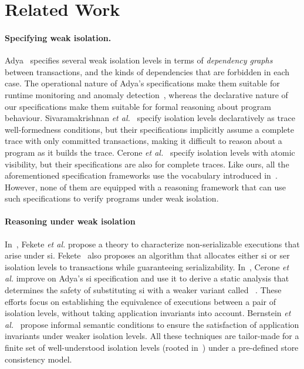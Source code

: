 \vspace*{-8pt}
\section{Related Work}
\label{sec:relatedwork}

\paragraph{Specifying weak isolation.}
Adya~\cite{adyaphd} specifies several weak isolation levels in terms
of \emph{dependency graphs} between transactions, and the kinds of
dependencies that are forbidden in each case. The operational nature
of Adya's specifications make them suitable for runtime monitoring and
anomaly detection~\cite{kemmevldb,feketesigmod08,pssi2011}, whereas
the declarative nature of our specifications make them suitable for
formal reasoning about program behaviour. Sivaramakrishnan \emph{et
al.}~\cite{pldi15} specify isolation levels declaratively as trace
well-formedness conditions, but their specifications implicitly assume
a complete trace with only committed transactions, making it difficult
to reason about a program as it builds the trace. Cerone \emph{et
al.}~\cite{gotsmanconcur15} specify isolation levels with atomic
visibility, but their specifications are also for complete traces.
Like ours, all the aforementioned specification frameworks use the
vocabulary introduced in~\cite{burckhardt14}. However, none of them
are equipped with a reasoning framework that can use such
specifications to verify programs under weak isolation.

\vspace*{-4pt}
\paragraph{Reasoning under weak isolation} In~\cite{feketessi}, Fekete
\emph{et al.} propose a theory to characterize non-serializable
executions that arise under {\sc si}. Fekete~\cite{fekete2005} also
proposes an algorithm that allocates either {\sc si} or {\sc ser}
isolation levels to transactions while guaranteeing
serializability. In~\cite{gotsmanpodc16}, Cerone \emph{et al.} improve
on Adya's {\sc si} specification and use it to derive a static
analysis that determines the safety of substituting {\sc si} with a
weaker variant called ~\cite{psi}.
These efforts focus on establishing the equivalence of executions
between a pair of isolation levels, without taking application
invariants into account.  Bernstein \emph{et al.}~\cite{bern2000}
propose informal semantic conditions to ensure the satisfaction of
application invariants under weaker isolation levels.  All these
techniques are tailor-made for a finite set of well-understood
isolation levels (rooted in~\cite{berenson}) under a pre-defined store
consistency model.

